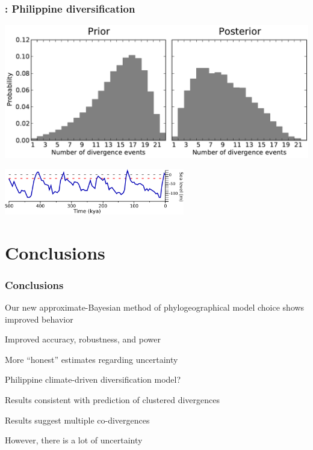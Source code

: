 \begin{frame}
    \frametitle{\dppmsbayes: Philippine diversification}
    \centerline{
    \includegraphics[width=\textwidth]{../../empirical-analyses/plots/philippines-dpp-psi-posterior-prior.pdf}}
    \smallskip
    \centerline{
    \includegraphics[height=2cm]{../images/sea-level-only.pdf}}
\end{frame}

\section{Conclusions}


\begin{frame}
    \frametitle{Conclusions}
    \begin{myitemize}
        \item<1-> Our new approximate-Bayesian method of phylogeographical
            model choice shows improved behavior
            \begin{myitemize}
                \item<1-> Improved accuracy, robustness, and power
                \item<1-> More ``honest'' estimates regarding
                    uncertainty
            \end{myitemize}
        \smallskip
        \item<2-> Philippine climate-driven diversification model?
            \begin{myitemize}
                \item<2-> Results consistent with prediction of clustered
                    divergences
                \item<2-> Results suggest multiple co-divergences
                \item<2-> However, there is a lot of uncertainty
            \end{myitemize}
    \end{myitemize}
\end{frame}

